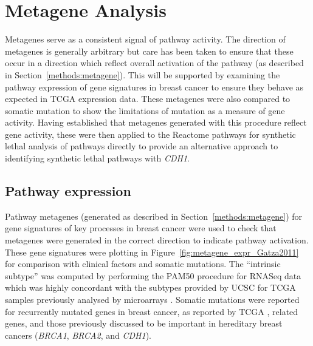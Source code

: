 \fi


\section{Metagene Analysis}  \label{chapt3:metagene_results}

Metagenes serve as a consistent signal of pathway activity. The direction of metagenes is generally arbitrary but care has been taken to ensure that these occur in a direction which reflect overall activation of the pathway (as described in Section~\ref{methods:metagene}). This will be supported by examining the pathway expression of gene signatures in breast cancer to ensure they behave as expected in TCGA expression data. These metagenes were also compared to somatic mutation to show the limitations of mutation as a measure of gene activity. Having established that metagenes generated with this procedure reflect gene activity, these were then applied to the Reactome pathways for synthetic lethal analysis of pathways directly to provide an alternative approach to identifying synthetic lethal pathways with \textit{CDH1}.

\subsection{Pathway expression} \label{chapt3:metagene_expression}

Pathway metagenes (generated as described in Section~\ref{methods:metagene}) for gene signatures of key processes in breast cancer \citep{Gatza2011} were used to check that metagenes were generated in the correct direction to indicate pathway activation. These gene signatures were plotting in Figure~\ref{fig:metagene_expr_Gatza2011} for comparison with clinical factors and somatic mutations. The ``intrinsic subtype''  was computed by performing the PAM50 procedure \cite{Parker2009} for RNASeq data which was highly concordant with the subtypes provided by UCSC for TCGA samples previously analysed by microarrays \citep{TCGA2012}. Somatic mutations were reported for recurrently mutated genes in breast cancer, as reported by TCGA \citep{TCGA2012}, related genes, and those previously discussed to be important in hereditary breast cancers (\textit{BRCA1}, \textit{BRCA2}, and \textit{CDH1}).

